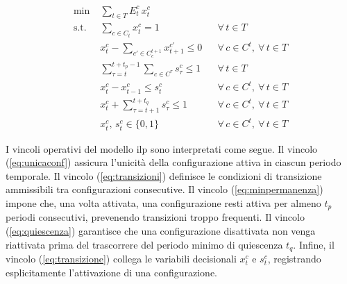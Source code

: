     \begin{subequations}\label{eq:modello}
    \begin{align}
    \min\;& \sum_{t \in T} E^c_t\, x^c_{t} \label{eq:objfun}\\
    \text{s.t.}\;& \sum_{c \in C_t} x^c_{t} = 1
        && \forall\,t \in T \label{eq:unicaconf}\\
    & x^c_{t} - \sum_{c' \in C_c^{t+1}} x^{c'}_{t+1} \le 0
        && \forall\,c \in C^t,\ \forall\,t \in T \label{eq:transizioni}\\
    & \sum_{\tau = t}^{t+t_p-1} \sum_{c \in C^{\tau}} s^c_{\tau} \le 1
        && \forall\,t \in T \label{eq:minpermanenza}\\
    & x^c_t - x^c_{t-1} \le s_t^c 
        && \forall\,c \in C^t,\ \forall\,t \in T \label{eq:transizione}\\
    & x^c_t + \sum_{\tau = t +1}^{t+t_q} s^c_{\tau} \le 1
        && \forall\,c \in C^t,\ \forall\,t \in T \label{eq:quiescenza}\\
    & x^c_t,\, s_t^c \in \{0,1\}
        && \forall\,c \in C^t,\ \forall\,t \in T \label{eq:binaria}
    \end{align}
    \end{subequations}

I vincoli operativi del modello \gls{ilp} sono interpretati come segue. Il vincolo (\ref{eq:unicaconf}) assicura l’unicità della configurazione attiva in ciascun periodo temporale. Il vincolo (\ref{eq:transizioni}) definisce le condizioni di transizione ammissibili tra configurazioni consecutive. Il vincolo (\ref{eq:minpermanenza}) impone che, una volta attivata, una configurazione resti attiva per almeno $t_p$ periodi consecutivi, prevenendo transizioni troppo frequenti. Il vincolo (\ref{eq:quiescenza}) garantisce che una configurazione disattivata non venga riattivata prima del trascorrere del periodo minimo di quiescenza $t_q$. Infine, il vincolo (\ref{eq:transizione}) collega le variabili decisionali $x^c_t$ e $s^c_t$, registrando esplicitamente l’attivazione di una configurazione.